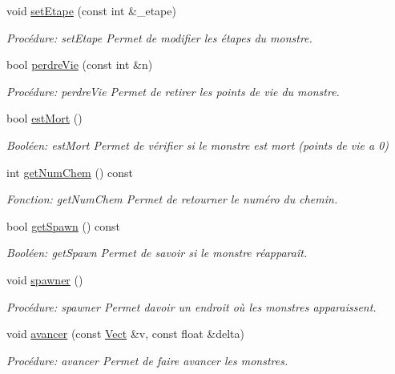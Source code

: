 \begin{DoxyCompactItemize}
void \hyperlink{classMonstre_a51895539b2db4bd6e267e0ac5a1729ce}{set\+Etape} (const int \&\+\_\+etape)
\begin{DoxyCompactList}\small\item\em Procédure\+: set\+Etape Permet de modifier les étapes du monstre. \end{DoxyCompactList}\item 
bool \hyperlink{classMonstre_af6d0a1f276465d12d50db387855e62d3}{perdre\+Vie} (const int \&n)
\begin{DoxyCompactList}\small\item\em Procédure\+: perdre\+Vie Permet de retirer les points de vie du monstre. \end{DoxyCompactList}\item 
bool \hyperlink{classMonstre_aebc60bc5dfa1353663ba975c589dc2e3}{est\+Mort} ()
\begin{DoxyCompactList}\small\item\em Booléen\+: est\+Mort Permet de vérifier si le monstre est mort (points de vie a 0) \end{DoxyCompactList}\item 
int \hyperlink{classMonstre_ac7998eae7604e8bbfb9aad3b3ea59c33}{get\+Num\+Chem} () const
\begin{DoxyCompactList}\small\item\em Fonction\+: get\+Num\+Chem Permet de retourner le numéro du chemin. \end{DoxyCompactList}\item 
bool \hyperlink{classMonstre_a810f2e49356248d02f7b0e9b8ea16d85}{get\+Spawn} () const
\begin{DoxyCompactList}\small\item\em Booléen\+: get\+Spawn Permet de savoir si le monstre réapparaît. \end{DoxyCompactList}\item 
void \hyperlink{classMonstre_a26db17b29af1a99278e7d21bc91f1532}{spawner} ()
\begin{DoxyCompactList}\small\item\em Procédure\+: spawner Permet d\textquotesingle{}avoir un endroit où les monstres apparaissent. \end{DoxyCompactList}\item 
void \hyperlink{classMonstre_ac8c771a6d9f612716b917688df56905f}{avancer} (const \hyperlink{classVect}{Vect} \&v, const float \&delta)
\begin{DoxyCompactList}\small\item\em Procédure\+: avancer Permet de faire avancer les monstres. \end{DoxyCompactList}\item 

\end{DoxyCompactItemize}
